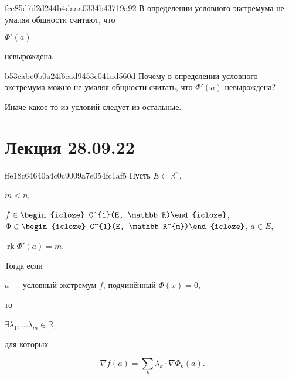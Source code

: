 \begin{note}{fce85d7d2d244b4daaa0334b43719a92}
    В определении условного экстремума не умаляя общности считают, что \begin{icloze}{2}\({ \Phi'(a) }\)\end{icloze} \begin{icloze}{1}невырождена.\end{icloze}
\end{note}

\begin{note}{b53cabc0b0a24f6ead9453c041ad560d}
    Почему в определении условного экстремума можно не умаляя общности считать, что \({ \Phi'(a) }\) невырождена?

    \begin{cloze}{1}
        Иначе какое-то из условий следует из остальные.
    \end{cloze}
\end{note}

\section{Лекция 28.09.22}
\begin{note}{ffe18c64640a4c0c9009a7e054fc1af5}
    Пусть \({ E \subset \mathbb R^{n} }\), \begin{icloze}{6}\({ m < n }\),\end{icloze} \({ f \in \begin{icloze}{4}C^{1}(E, \mathbb R)\end{icloze} }\), \({ \Phi \in \begin{icloze}{4}C^{1}(E, \mathbb R^{m})\end{icloze} }\), \({ a \in E }\), \begin{icloze}{5}\({ \operatorname{rk} \Phi'(a) = m }\).\end{icloze}
    Тогда если \begin{icloze}{3}\({ a }\) --- условный экстремум \({ f }\), подчинённый \({ \Phi(x) = 0 }\),\end{icloze} то \begin{icloze}{2}\({ \exists \lambda_1, \ldots \lambda_m \in \mathbb R }\),\end{icloze} для которых
    \begin{icloze}{1}
        \[
            \nabla f(a) = \sum_{k} \lambda_k \cdot \nabla \Phi_k(a).
        \]
    \end{icloze}
\end{note}

